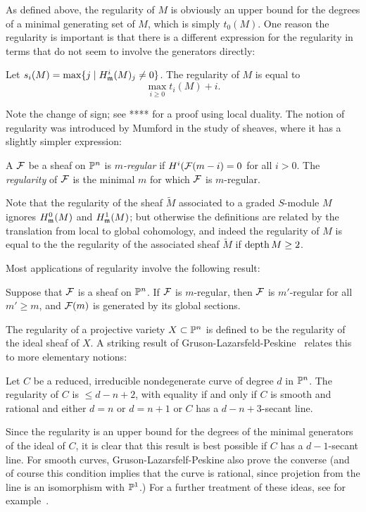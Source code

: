 As defined above, the regularity of $M$ is obviously an upper bound for the degrees of a minimal generating
set of $M$, which is simply $t_{0}(M)$. One reason the regularity is important is that there is a different expression for the regularity in terms that do not seem to involve the generators directly:

\begin{theorem}
 Let $s_{i}(M) = \max\{j \mid H^{i}_{\mathfrak m}(M)_{j} \neq 0\}$. The regularity of $M$ is equal to
 $$
\max_{i \geq 0} t_{i}(M)+i.
$$
\end{theorem}

Note the change of sign; see **** for a proof using local duality. The notion of regularity was introduced by Mumford in the study of sheaves, where it has a slightly simpler expression:

\begin{definition}
A ${\mathcal F}$ be a sheaf on ${\mathbb P}^{n}$ is \emph{$m$-regular} if $H^{i}({\mathcal F}(m-i) = 0$ for all $i>0$. The \emph{regularity} of ${\mathcal F}$ is the minimal $m$ for which ${\mathcal F}$ is $m$-regular.
\end{definition}

 Note that the regularity
of the sheaf $\tilde M$ associated to a graded $S$-module $M$ ignores $H^{0}_{\mathfrak m}(M)$ and 
$H^{1}_{\mathfrak m}(M)$; but otherwise the definitions are related by the translation from local to global
cohomology, and indeed the regularity of
$M$ is equal to the the regularity of the associated sheaf $\tilde M$ if $\operatorname{depth} M \geq 2$. 

Most applications of
regularity involve the following result:
\begin{theorem}

Suppose that ${\mathcal F}$ is a sheaf on ${\mathbb P}^{n}$. If ${\mathcal F}$ is $m$-regular, then ${\mathcal F}$ is $m'$-regular for all $m'\geq m$, and ${\mathcal F}(m)$ is generated by its global sections.
\end{theorem}

The regularity of a projective variety $X\subset {\mathbb P}^{n}$ is  defined to be the regularity of the ideal sheaf of $X$. A striking result of Gruson-Lazarsfeld-Peskine~\cite{} relates this to more elementary notions:

\begin{theorem}\label{GLP}
 Let $C$ be a reduced, irreducible nondegenerate curve of degree $d$ in ${\mathbb P}^{n}$. The regularity of $C$ is $\leq d-n+2$, with equality if and only if $C$ is smooth and rational and either $d=n$ or $d=n+1$ or $C$ has a $d-n+3$-secant line. 
 \end{theorem}
 
Since the regularity is an upper bound for the degrees of the minimal generators of the ideal of $C$, it is clear that this result is best possible if $C$ has a $d-1$-secant line. For smooth curves, Gruson-Lazarsfelf-Peskine also prove the converse (and of course this condition implies that the curve is rational, since projetion from the line is an isomorphism with ${\mathbb P}^{1}$.)
For a further treatment of these ideas, see for example~\cite{geomsyz}.


